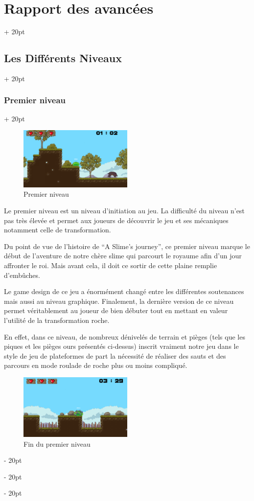 \documentclass[a4paper, 12pt, twoside]{article}
\newcommand{\ind}[1][20pt]{\advance\leftskip + #1}
\newcommand{\deind}[1][20pt]{\advance\leftskip - #1}
\newenvironment{indt}[2][20pt]{#2 \par \ind[#1]}{\par \deind} %
\begin{document}
\begin{indt}{\section{Rapport des avancées}}
\begin{indt}{\subsection{Les Différents Niveaux}}
            \begin{indt}{\subsubsection{Premier niveau}}
                \begin{figure}[h]
                    \centering
                    \includegraphics[width=0.5\textwidth]{niv1.png}
                    \caption{Premier niveau}
                    \label{fig:mesh1}
                \end{figure}

                Le premier niveau est un niveau d’initiation au jeu. La difficulté du niveau n’est pas très élevée et permet aux joueurs de découvrir le jeu et ses mécaniques notamment celle de transformation.

                Du point de vue de l'histoire de “A Slime’s journey”, ce premier niveau marque le début de l’aventure de notre chère slime qui parcourt le royaume afin d’un jour affronter le roi. Mais avant cela, il doit ce sortir de cette plaine remplie d'embûches.

                Le game design de ce jeu a énormément changé entre les différentes soutenances mais aussi au niveau graphique. Finalement, la dernière version de ce niveau permet véritablement au joueur de bien débuter tout en mettant en valeur l’utilité de la transformation roche.

                En effet, dans ce niveau, de nombreux dénivelés de terrain et pièges (tels que les piques et les pièges ours présentés ci-dessus) inscrit vraiment notre jeu dans le style de jeu de plateformes de part la nécessité de réaliser des sauts et des parcours en mode roulade de roche plus ou moins compliqué.

                \begin{figure}[h]
                    \centering
                    \includegraphics[width=0.5\textwidth]{niv1_rck.png}
                    \caption{Fin du premier niveau}
                    \label{fig:mesh1}
                \end{figure}


\end{indt}
\end{indt}
\end{indt}
\end{document}
